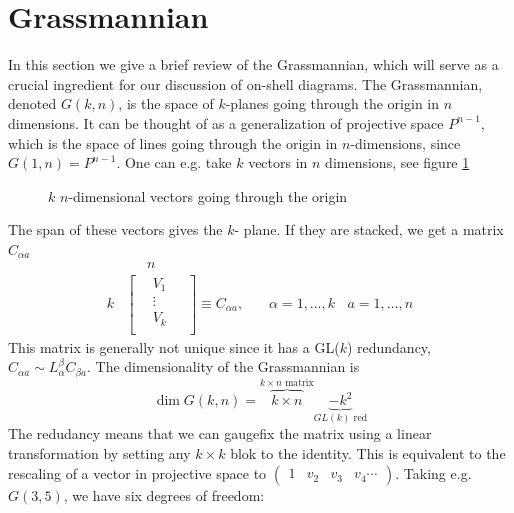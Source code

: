 \documentclass[letter,11pt]{article}
\begin{document}
\section{Grassmannian\label{sec:grassmanian}}
In this section we give a brief review of the Grassmannian, which will serve as a crucial ingredient for our discussion of on-shell diagrams.
The Grassmannian, denoted $G(k,n)$, is the space of $k$-planes going through the origin in $n$ dimensions. It can be thought of as a generalization of projective space $P^{n-1}$, which is the space of lines going through the origin in $n$-dimensions, since $G(1,n)=P^{n-1}$. One can e.g. take $k$ vectors in $n$ dimensions, see figure \ref{fig:1}
\begin{figure}[H]
	\centering
{}
\label{fig:1}
\caption{$k$ $n$-dimensional vectors going through the origin}
\end{figure}
The span of these vectors gives the $k$- plane. If they are stacked, we get a matrix $C_{\alpha a}$
\begin{equation}
\begin{aligned}
	&~~~~~~~n\\
	k&
\begin{bmatrix}
	~~~~V_1~~~~~\\
	~~~~\vdots ~~~~~\\
	~~~~V_k~~~~~\\
\end{bmatrix}\equiv C_{\alpha a},~~~~~~~~\alpha=1,\dots,k~~~~a=1,\dots,n
\end{aligned}
\end{equation}
This matrix is generally not unique since it has a GL($k$) redundancy, $
C_{\alpha a}\sim L^{\beta}_\alpha C_{\beta a}$.
The dimensionality of the Grassmannian is 
\begin{equation}
\dim G(k,n)=\overbrace{k\times n}^{k\times n \text{ matrix}}\underbrace{-k^2}_{GL(k) \text{ red}}
\end{equation}
The redudancy means that we can gaugefix the matrix using a linear transformation by setting any $k\times k$ blok to the identity. This is equivalent to the rescaling of a vector in projective space to $\begin{pmatrix}
1 & v_2 & v_3 & v_4 \cdots
\end{pmatrix}$. Taking e.g. $G(3,5)$, we have six degrees of freedom:
\end{document}
